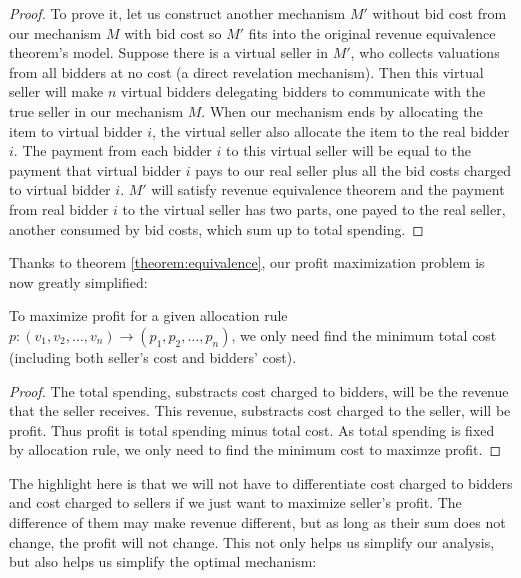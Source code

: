 \begin{proof}
To prove it, let us construct another mechanism
$M'$ without bid cost from our mechanism $M$ with bid cost so $M'$ fits
into the original revenue equivalence theorem's model. Suppose there is a
virtual seller in $M'$, who collects valuations from all bidders at no cost (a
direct revelation mechanism). Then this virtual seller will make $n$ virtual
bidders delegating bidders to communicate with the true seller in our mechanism
$M$.  When our mechanism ends by allocating the item to virtual bidder $i$, the
virtual seller also allocate the item to the real bidder $i$. The payment from
each bidder $i$ to this virtual seller will be equal to the payment that
virtual bidder $i$ pays to our real seller plus all the bid costs charged
to virtual bidder $i$.
$M'$ will satisfy revenue equivalence theorem and
the payment from real bidder
$i$ to the virtual seller has two parts, one payed to the real
seller, another consumed by bid costs, which sum up to total spending.
\end{proof}

Thanks to theorem \ref{theorem:equivalence}, our profit maximization problem
is now greatly simplified: 

\begin{corollary}
To maximize profit for a given allocation rule $p: (v_1, v_2, \ldots, v_n)
\rightarrow (p_1, p_2, \ldots, p_n)$, we only need find the minimum total cost
(including both seller's cost and bidders' cost).
\end{corollary}

\begin{proof}
The total spending, substracts cost charged to bidders, will be the revenue
that the seller receives.  This revenue, substracts cost charged to the seller,
will be profit. Thus profit is total spending minus total cost. As total
spending is fixed by allocation rule, we only need to find the minimum cost to
maximze profit.
\end{proof}

The highlight here is that we will not have to differentiate cost charged to
bidders and cost charged to sellers if we just want to maximize seller's profit.
The difference of them may make revenue different, but as long as their sum
does not change, the profit will not change. This not only helps us simplify our
analysis, but also helps us simplify the optimal mechanism: 

